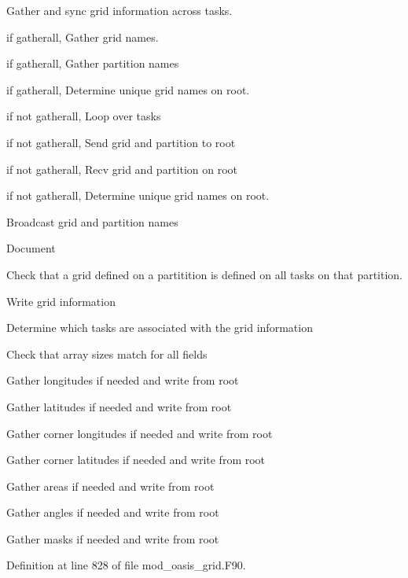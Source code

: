\begin{DoxyItemize}
\item Gather and sync grid information across tasks.
\begin{DoxyItemize}
\item if gatherall, Gather grid names.
\item if gatherall, Gather partition names
\item if gatherall, Determine unique grid names on root.
\item if not gatherall, Loop over tasks
\begin{DoxyItemize}
\item if not gatherall, Send grid and partition to root
\item if not gatherall, Recv grid and partition on root
\item if not gatherall, Determine unique grid names on root.
\end{DoxyItemize}
\item Broadcast grid and partition names
\end{DoxyItemize}
\item Document
\item Check that a grid defined on a partitition is defined on all tasks on that partition.
\item Write grid information
\begin{DoxyItemize}
\item Determine which tasks are associated with the grid information
\item Check that array sizes match for all fields
\item Gather longitudes if needed and write from root
\item Gather latitudes if needed and write from root
\item Gather corner longitudes if needed and write from root
\item Gather corner latitudes if needed and write from root
\item Gather areas if needed and write from root
\item Gather angles if needed and write from root
\item Gather masks if needed and write from root 
\end{DoxyItemize}
\end{DoxyItemize}

Definition at line 828 of file mod\+\_\+oasis\+\_\+grid.\+F90.

